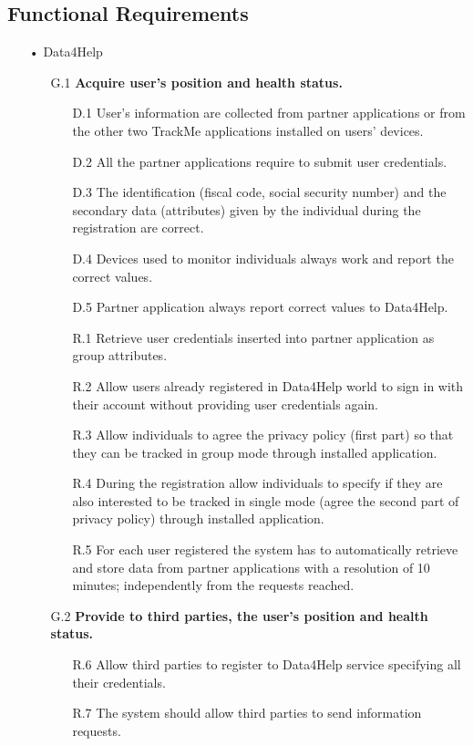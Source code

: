 \subsection{Functional Requirements}
\begin{enumerate}
\item[•]{\Large Data4Help}
	\begin{enumerate}
	\item [G.1] \textbf{Acquire user's position and health status.}
		\begin{enumerate}
		\item [D.1] User's information are collected from partner applications or from the other two TrackMe applications installed on users' devices.
		\item [D.2] All the partner applications require to submit user credentials.
		\item [D.3] The identification (fiscal code, social security number) and the secondary data (attributes) given by the individual during the registration are correct.
		\item [D.4] Devices used to monitor individuals always work and report the correct values.	
    	     \item [D.5] Partner application always report correct values to Data4Help.
		\item [R.1] Retrieve user credentials inserted into partner application as group attributes.
		\item [R.2] Allow users already registered in Data4Help world to sign in with their account without providing user credentials again.
		\item [R.3] Allow individuals to agree the privacy policy (first part) so that they can be tracked in group mode through installed application.  
		\item [R.4] During the registration allow individuals to specify if they are also interested to be tracked in single mode (agree the second part of privacy policy) through installed application. 
       	\item [R.5] For each user registered the system has to automatically retrieve and store data from partner applications with a resolution of 10 minutes; independently from the requests reached.
    	\end{enumerate}	
    	
    \item [G.2] \textbf{Provide to third parties, the user's position and health status.}
    	\begin{enumerate} 
    	\item [R.6] Allow third parties to register to Data4Help service specifying all their credentials.
		\item [R.7] The system should allow third parties to send information requests.
    	\end{enumerate}	
		

\end{enumerate}
\end{enumerate}
